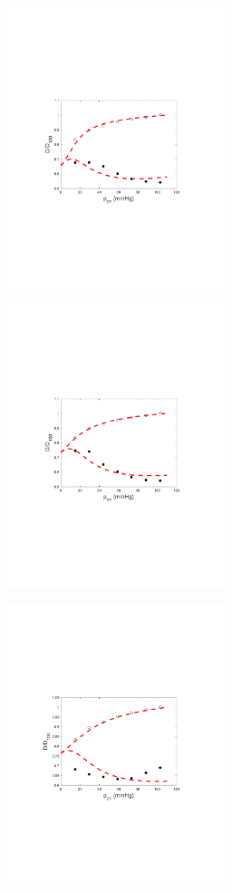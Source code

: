 \documentclass[../main.tex]{article}
\begin{document}
\begin{figure}[t!]
\begin{center}
\begin{subfigure}{0.45\textwidth}
		\end{subfigure}
		\begin{subfigure}{0.45\textwidth}
			\centering
			\includegraphics[width=2.5in,trim={3.25cm 8cm 4cm 8cm},clip]{LA_subendo.pdf}
		\end{subfigure}
		\begin{subfigure}{0.45\textwidth}
			\centering
			\includegraphics[width=2.5in,trim={3.25cm 8cm 4cm 8cm},clip]{IA_subendo.pdf}
		\end{subfigure}
		\begin{subfigure}{0.45\textwidth}
			\centering
			\includegraphics[width=2.5in,trim={3.25cm 8cm 4cm 8cm},clip]{SA_subendo.pdf}
		\end{subfigure}				
	\end{center}
\end{figure}	
\end{document}
